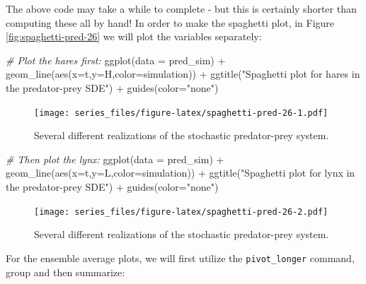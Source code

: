 \documentclass[
]{book}
\newenvironment{Shaded}{\begin{snugshade}}{\end{snugshade}}
\newcommand{\AttributeTok}[1]{\textcolor[rgb]{0.77,0.63,0.00}{#1}}
\newcommand{\CommentTok}[1]{\textcolor[rgb]{0.56,0.35,0.01}{\textit{#1}}}
\newcommand{\FunctionTok}[1]{\textcolor[rgb]{0.00,0.00,0.00}{#1}}
\newcommand{\NormalTok}[1]{#1}
\newcommand{\SpecialCharTok}[1]{\textcolor[rgb]{0.00,0.00,0.00}{#1}}
\newcommand{\StringTok}[1]{\textcolor[rgb]{0.31,0.60,0.02}{#1}}
\theoremstyle{definition}
\theoremstyle{definition}
\theoremstyle{definition}
\theoremstyle{remark}
\begin{document}
The above code may take a while to complete - but this is certainly shorter than computing these all by hand! In order to make the spaghetti plot, in Figure \ref{fig:spaghetti-pred-26} we will plot the variables separately:

\begin{Shaded}
\begin{Highlighting}[]
\CommentTok{\# Plot the hares first:}
\FunctionTok{ggplot}\NormalTok{(}\AttributeTok{data =}\NormalTok{ pred\_sim) }\SpecialCharTok{+}
  \FunctionTok{geom\_line}\NormalTok{(}\FunctionTok{aes}\NormalTok{(}\AttributeTok{x=}\NormalTok{t,}\AttributeTok{y=}\NormalTok{H,}\AttributeTok{color=}\NormalTok{simulation)) }\SpecialCharTok{+}
  \FunctionTok{ggtitle}\NormalTok{(}\StringTok{"Spaghetti plot for hares in the predator{-}prey SDE"}\NormalTok{) }\SpecialCharTok{+}
  \FunctionTok{guides}\NormalTok{(}\AttributeTok{color=}\StringTok{"none"}\NormalTok{)}
\end{Highlighting}
\end{Shaded}

\begin{figure}
\centering
\texttt{[image: series\_files/figure-latex/spaghetti-pred-26-1.pdf]}
\caption{\label{fig:spaghetti-pred-26-1}Several different realizations of the stochastic predator-prey system.}
\end{figure}

\begin{Shaded}
\begin{Highlighting}[]
\CommentTok{\# Then plot the lynx:}
\FunctionTok{ggplot}\NormalTok{(}\AttributeTok{data =}\NormalTok{ pred\_sim) }\SpecialCharTok{+}
  \FunctionTok{geom\_line}\NormalTok{(}\FunctionTok{aes}\NormalTok{(}\AttributeTok{x=}\NormalTok{t,}\AttributeTok{y=}\NormalTok{L,}\AttributeTok{color=}\NormalTok{simulation)) }\SpecialCharTok{+}
  \FunctionTok{ggtitle}\NormalTok{(}\StringTok{"Spaghetti plot for lynx in the predator{-}prey SDE"}\NormalTok{) }\SpecialCharTok{+}
  \FunctionTok{guides}\NormalTok{(}\AttributeTok{color=}\StringTok{"none"}\NormalTok{)}
\end{Highlighting}
\end{Shaded}

\begin{figure}
\centering
\texttt{[image: series\_files/figure-latex/spaghetti-pred-26-2.pdf]}
\caption{\label{fig:spaghetti-pred-26-2}Several different realizations of the stochastic predator-prey system.}
\end{figure}

For the ensemble average plots, we will first utilize the \texttt{pivot\_longer} command, group and then summarize:
\end{document}
